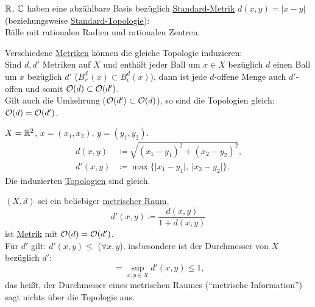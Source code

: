 \begin{example}
  $ \mathbb{R} $, $ \mathbb{C} $ haben eine abzählbare Basis bezüglich \hyperref[bsp:standardmetrik]{Standard-Metrik} $ d(x,y) = \vert x - y \vert $ (beziehungsweise \hyperref[bsp:standardtopologie]{Standard-Topologie}): \\
  Bälle mit rationalen Radien und rationalen Zentren.
\end{example}

\begin{remark}
  Verschiedene \hyperref[def:metrik]{Metriken} können die gleiche Topologie induzieren: \\
  Sind $ d, d' $ Metriken auf $ X $ und enthält jeder Ball um $ x \in X $ bezüglich $ d $ einen Ball um $ x $ bezüglich $ d' $ ($ B_{\epsilon'}^d(x) \subset B_\epsilon^d(x) $), dann ist jede $ d $-offene Menge auch $ d' $-offen und somit $ \mathcal{O}(d) \subset \mathcal{O}(d') $. \\
  Gilt auch die Umkehrung ($ \mathcal{O}(d') \subset \mathcal{O}(d) $), so sind die Topologien gleich: $ \mathcal{O}(d) = \mathcal{O}(d') $.
\end{remark}

\begin{example}
  $ X = \mathbb{R}^2 $, $ x = (x_1, x_2) $, $ y = (y_1, y_2) $.
  \begin{align*}
    d(x,y) &\coloneqq \sqrt{(x_1-y_1)^2+(x_2-y_2)^2}\text{,} \\
    d'(x,y) &\coloneqq \max\{ \vert x_1-y_1\vert, \ \vert x_2-y_2 \vert \}\text{.}
  \end{align*}
  Die induzierten \hyperref[def:topologie]{Topologien} sind gleich.
\end{example}

\begin{example}
  $ (X, d) $ sei ein beliebiger \hyperref[def:metrischerRaum]{metrischer Raum},
  \begin{equation*}
    d'(x,y) \coloneqq \frac{d(x,y)}{1 + d(x,y)}
  \end{equation*}
  ist \hyperref[def:metrik]{Metrik} mit $ \mathcal{O}(d) = \mathcal{O}(d') $. \\
  Für $ d' $ gilt: $ d'(x,y) \leq $ ($ \forall x,y $), insbesondere ist der Durchmesser von $ X $ bezüglich $ d' $:
  \begin{equation*}
    = \sup_{x,y \in X}d'(x,y) \leq 1\text{,}
  \end{equation*}
  das heißt, der Durchmesser eines metrischen Raumes (``metrische Information'') sagt nichts über die Topologie aus.
\end{example}

